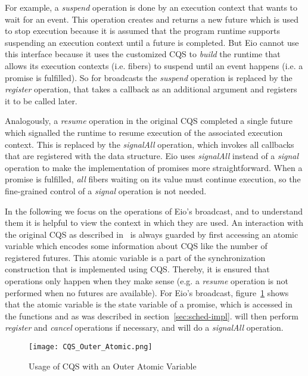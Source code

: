For example, a \emph{suspend} operation is done by an execution context that wants to wait for an event.
This operation creates and returns a new future which is used to stop execution because it is assumed that the program runtime supports suspending an execution context until a future is completed.
But Eio cannot use this interface because it uses the customized CQS to \emph{build} the runtime that allows its execution contexts (i.e. fibers) to suspend until an event happens (i.e. a promise is fulfilled).
So for broadcasts the \emph{suspend} operation is replaced by the \emph{register} operation, that takes a callback as an additional argument and registers it to be called later.

Analogously, a \emph{resume} operation in the original CQS completed a single future which signalled the runtime to resume execution of the associated execution context.
This is replaced by the \emph{signalAll} operation, which invokes all callbacks that are registered with the data structure.
Eio uses \emph{signalAll} instead of a \emph{signal} operation to make the implementation of promises more straightforward.
When a promise is fulfilled, \emph{all} fibers waiting on its value must continue execution, so the fine-grained control of a \emph{signal} operation is not needed.


In the following we focus on the operations of Eio's broadcast, and to understand them it is helpful to view the context in which they are used.
An interaction with the original CQS as described in~\cite{koval2023cqs} is always guarded by first accessing an atomic variable which encodes some information about CQS like the number of registered futures.
This atomic variable is a part of the synchronization construction that is implemented using CQS.
Thereby, it is ensured that operations only happen when they make sense (e.g. a \emph{resume} operation is not performed when no futures are available).
For Eio's broadcast, figure~\ref{fig:cqs-usage} shows that the atomic variable is the state variable of a promise, which is accessed in the functions  and  as was described in section~\ref{sec:sched-impl}.
 will then perform \emph{register} and \emph{cancel} operations if necessary, and  will do a \emph{signalAll} operation.

\begin{figure}[ht]
  \texttt{[image: CQS\_Outer\_Atomic.png]}
  \caption{Usage of CQS with an Outer Atomic Variable}
  \label{fig:cqs-usage}
\end{figure}

